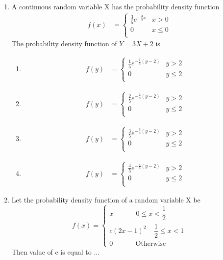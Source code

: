 \begin{enumerate}[label=\thesection.\arabic*.,ref=\thesection.\theenumi]
\item A continuous random variable X has the probability density function
\begin{align*}
    f(x) &= \begin{cases} 
      \frac{3}{5}e^{-\frac{3}{5}x} & x > 0 \\
      0 & x\leq 0\\
   \end{cases} 
\end{align*} 
The probability density function of $Y=3X+2$  is
\begin{enumerate}
    \item \begin{align*}
         f(y) &= \begin{cases} 
      \frac{1}{5}e^{-\frac{1}{5} (y-2)} & y > 2 \\
      0 & y \leq 2\\
   \end{cases} 
    \end{align*}
\item \begin{align*}
    f(y) &= \begin{cases} 
      \frac{2}{5}e^{-\frac{2}{5} (y-2)} & y > 2 \\
      0 & y \leq 2\\
   \end{cases} 
\end{align*} 
\item  \begin{align*}
    f(y) &= \begin{cases} 
      \frac{3}{5}e^{-\frac{3}{5} (y-2)} & y > 2 \\
      0 & y \leq 2\\
   \end{cases} 
\end{align*} 
\item \begin{align*}
    f(y) &= \begin{cases} 
      \frac{4}{5}e^{-\frac{4}{5} (y-2)} & y > 2 \\
      0 & y \leq 2\\
   \end{cases} 
\end{align*} 
\end{enumerate}
%
\solution


\item    Let the probability density function of a random variable X be
   $$
   f(x)=
   \begin{cases}
   x~~~~~~~~~~~~~~~0\leqslant x < \dfrac{1}{2}\\
   c(2x-1)^2~~~~~\dfrac{1}{2}\leqslant x <1\\
   0 ~~~~~~~~~~~~~~~\text{Otherwise}
   \end{cases}
   $$
   Then value of c is equal to ...
   \\
\solution



\end{enumerate}
